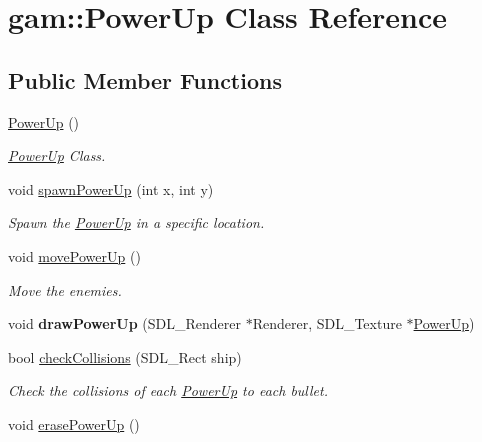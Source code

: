 \hypertarget{classgam_1_1_power_up}{\section{gam\+:\+:Power\+Up Class Reference}
\label{classgam_1_1_power_up}
}
\subsection*{Public Member Functions}
\begin{DoxyCompactItemize}
\item 
\hyperlink{classgam_1_1_power_up_a4471b8185823a330a9c5bcdb07f1b58c}{Power\+Up} ()
\begin{DoxyCompactList}\small\item\em \hyperlink{classgam_1_1_power_up}{Power\+Up} Class. \end{DoxyCompactList}\item 
void \hyperlink{classgam_1_1_power_up_abe6a85b657c4c56fb70d68703fdb9abb}{spawn\+Power\+Up} (int x, int y)
\begin{DoxyCompactList}\small\item\em Spawn the \hyperlink{classgam_1_1_power_up}{Power\+Up} in a specific location. \end{DoxyCompactList}\item 
\hypertarget{classgam_1_1_power_up_a13e72270e42fe3dd5b068f80eb8efaf4}{void \hyperlink{classgam_1_1_power_up_a13e72270e42fe3dd5b068f80eb8efaf4}{move\+Power\+Up} ()}\label{classgam_1_1_power_up_a13e72270e42fe3dd5b068f80eb8efaf4}

\begin{DoxyCompactList}\small\item\em Move the enemies. \end{DoxyCompactList}\item 
\hypertarget{classgam_1_1_power_up_aa10fa7beaa2414795295e7aa2ddfc405}{void {\bfseries draw\+Power\+Up} (S\+D\+L\+\_\+\+Renderer $\ast$Renderer, S\+D\+L\+\_\+\+Texture $\ast$\hyperlink{classgam_1_1_power_up}{Power\+Up})}\label{classgam_1_1_power_up_aa10fa7beaa2414795295e7aa2ddfc405}

\item 
\hypertarget{classgam_1_1_power_up_ab9f6298c0d96ccfa66345464a58a1fd7}{bool \hyperlink{classgam_1_1_power_up_ab9f6298c0d96ccfa66345464a58a1fd7}{check\+Collisions} (S\+D\+L\+\_\+\+Rect ship)}\label{classgam_1_1_power_up_ab9f6298c0d96ccfa66345464a58a1fd7}

\begin{DoxyCompactList}\small\item\em Check the collisions of each \hyperlink{classgam_1_1_power_up}{Power\+Up} to each bullet. \end{DoxyCompactList}\item 
\hypertarget{classgam_1_1_power_up_a73cafdaf54d9e72a50b30718639cef88}{void \hyperlink{classgam_1_1_power_up_a73cafdaf54d9e72a50b30718639cef88}{erase\+Power\+Up} ()}\label{classgam_1_1_power_up_a73cafdaf54d9e72a50b30718639cef88}


\end{DoxyCompactItemize}
